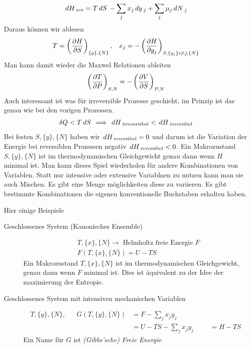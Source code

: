 \begin{description}
\begin{align*}
      \,dH\,_{\text{rev}} = T \,dS\, - \sum_{j}^{} x_j \,dy\,_j + \sum_{j}^{}
      \mu_j \,dN\,_j
    \end{align*}
    Daraus können wir ablesen
    \begin{align*}
      T = \left( \frac{\partial H }{\partial S} \right)_{ \left\{ y \right\}, \left\{ N \right\} }, &&
      x_j = - \left( \frac{\partial H }{\partial y_j} \right)_{ S, \left\{ y_j \right\} i\neq j, \left\{ N \right\} }
    \end{align*}
    Man kann damit wieder die Maxwel Relationen ableiten
    \begin{align*}
      \left( \frac{\partial T }{\partial P} \right)_{S, N} = - \left( \frac{\partial V }{\partial S} \right)_{P, N}
    \end{align*}
    Auch interessant ist was für irreversible Prozesse geschieht, im Prinzip
    ist das genau wie bei den vorigen Prozessen.
    \begin{align*}
      \delta Q < T \,dS\, \implies \,dH\,_{\text{irreversibel}} < \,dH\,_{\text{reversibel}}
    \end{align*}
    Bei festen $S, \{y\}, \{N\}$ haben wir $ \,dH\,_{\text{reversibel}} = 0$
    und darum ist die Variation der Energie bei reversiblen Prozessen negativ
    $ \,dH\,_{\text{reversibel}} < 0$. 
    Ein Makrozustand $S, \{y\}, \{N\}$ ist im thermodynamischen Gleichgewicht
    genau dann wenn $H$ minimal ist.
    Man kann dieses Spiel wiederholen für andere Kombinationen von Variablen.
    Statt nur intensive oder extensive Variablnen zu nutzen kann man sie auch Mischen.
    Es gibt eine Menge möglichkeiten diese zu variieren. Es gibt bestimmte
    Kombinationen die eigenen konventionelle Buchstaben erhalten haben. 
\end{description}

Hier einige Beispiele
\begin{description}
  \item[Geschlossenes System (Kanonisches Ensemble)] 
    \begin{align*}
      & T, \{x\}, \{N\} \to \text{ Helmholtz freie Energie } F \\
      & F(T, \{x\}, \{N\}) = U - TS
    \end{align*}
    Ein Makrozustand $T, \{x\}, \{N\}$ ist im thermodynamischen Gleichgewicht, genau
    dann wenn $F$ minimal ist. Dies ist äquivalent zu der Idee der maximierung
    der Entropie.
  \item[Geschlossenes System mit intensiven mechanischen Variablen]
    \begin{align*}
      T, \{y\}, \{N\}, && G(T, \{y\}, \{N\}) & = F - \sum_{j}^{}x_j y_j \\
                       && & =  U - TS - \sum_{j}^{} x_j y_j
                       && & = H - TS
    \end{align*}
    Ein Name für $G$ ist \emph{(Gibbs'sche) Freie Energie}
\end{description}
